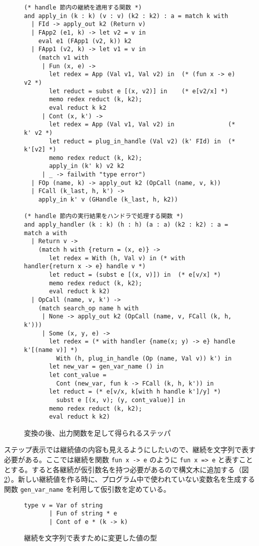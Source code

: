 \begin{figure}
\begin{verbatim}
(* handle 節内の継続を適用する関数 *)
and apply_in (k : k) (v : v) (k2 : k2) : a = match k with
  | FId -> apply_out k2 (Return v)
  | FApp2 (e1, k) -> let v2 = v in
    eval e1 (FApp1 (v2, k)) k2
  | FApp1 (v2, k) -> let v1 = v in
    (match v1 with
     | Fun (x, e) ->
       let redex = App (Val v1, Val v2) in  (* (fun x -> e) v2 *)
       let reduct = subst e [(x, v2)] in    (* e[v2/x] *)
       memo redex reduct (k, k2);
       eval reduct k k2
     | Cont (x, k') ->
       let redex = App (Val v1, Val v2) in               (* k' v2 *)
       let reduct = plug_in_handle (Val v2) (k' FId) in  (* k'[v2] *)
       memo redex reduct (k, k2);
       apply_in (k' k) v2 k2
     | _ -> failwith "type error")
  | FOp (name, k) -> apply_out k2 (OpCall (name, v, k))
  | FCall (k_last, h, k') ->
    apply_in k' v (GHandle (k_last, h, k2))

(* handle 節内の実行結果をハンドラで処理する関数 *)
and apply_handler (k : k) (h : h) (a : a) (k2 : k2) : a = match a with
  | Return v ->
    (match h with {return = (x, e)} ->
       let redex = With (h, Val v) in (* with handler{return x -> e} handle v *)
       let reduct = (subst e [(x, v)]) in  (* e[v/x] *)
       memo redex reduct (k, k2);
       eval reduct k k2)
  | OpCall (name, v, k') ->
    (match search_op name h with
     | None -> apply_out k2 (OpCall (name, v, FCall (k, h, k')))
     | Some (x, y, e) ->
       let redex = (* with handler {name(x; y) -> e} handle k'[(name v)] *)
         With (h, plug_in_handle (Op (name, Val v)) k') in
       let new_var = gen_var_name () in
       let cont_value =
         Cont (new_var, fun k -> FCall (k, h, k')) in
       let reduct = (* e[v/x, k[with h handle k']/y] *)
         subst e [(x, v); (y, cont_value)] in
       memo redex reduct (k, k2);
       eval reduct k k2)
\end{verbatim}
\caption{変換の後、出力関数を足して得られるステッパ}
\label{figure:5memo}
\end{figure}

ステップ表示では継続値の内容も見えるようにしたいので、継続を文字列で表す必要がある。ここでは継続を関数 \texttt{fun x -> e} のように \texttt{fun x => e} と表すこととする。すると各継続が仮引数名を持つ必要があるので構文木に追加する（図\ref{figure:v_5memo}）。新しい継続値を作る時に、プログラム中で使われていない変数名を生成する関数 \texttt{gen\_var\_name} を利用して仮引数を定めている。

\begin{figure}
\begin{verbatim}
type v = Var of string
       | Fun of string * e
       | Cont of e * (k -> k)
\end{verbatim}
\caption{継続を文字列で表すために変更した値の型}
\label{figure:v_5memo}
\end{figure}

